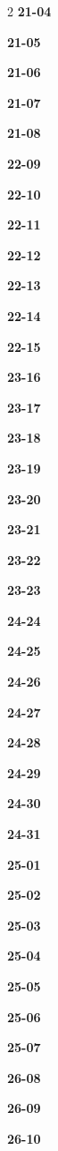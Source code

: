 \documentclass[10pt,a4paper]{article}
\begin{document}
\begin{multicols}{2}
\noindent\textbf{21-04}\ \par
\noindent\textbf{21-05}\ \par
\noindent\textbf{21-06}\ \par
\noindent\textbf{21-07}\ \par
\noindent\textbf{21-08}\ \par
\noindent\textbf{22-09}\ \par
\noindent\textbf{22-10}\ \par
\noindent\textbf{22-11}\ \par
\noindent\textbf{22-12}\ \par
\noindent\textbf{22-13}\ \par
\noindent\textbf{22-14}\ \par
\noindent\textbf{22-15}\ \par
\noindent\textbf{23-16}\ \par
\noindent\textbf{23-17}\ \par
\noindent\textbf{23-18}\ \par
\noindent\textbf{23-19}\ \par
\noindent\textbf{23-20}\ \par
\noindent\textbf{23-21}\ \par
\noindent\textbf{23-22}\ \par
\noindent\textbf{23-23}\ \par
\noindent\textbf{24-24}\ \par
\noindent\textbf{24-25}\ \par
\noindent\textbf{24-26}\ \par
\noindent\textbf{24-27}\ \par
\noindent\textbf{24-28}\ \par
\noindent\textbf{24-29}\ \par
\noindent\textbf{24-30}\ \par
\noindent\textbf{24-31}\ \par
\noindent\textbf{25-01}\ \par
\noindent\textbf{25-02}\ \par
\noindent\textbf{25-03}\ \par
\noindent\textbf{25-04}\ \par
\noindent\textbf{25-05}\ \par
\noindent\textbf{25-06}\ \par
\noindent\textbf{25-07}\ \par
\noindent\textbf{26-08}\ \par
\noindent\textbf{26-09}\ \par
\noindent\textbf{26-10}\ \par

\end{multicols}
\end{document}
